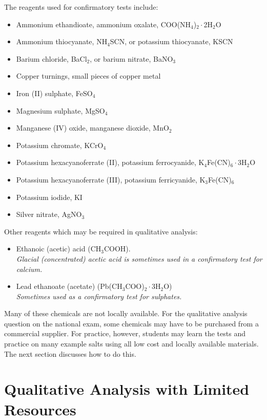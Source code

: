 The reagents used for confirmatory tests include:
\begin{itemize}
\item{Ammonium ethandioate, 
ammonium oxalate, 
COO(NH$_{4}$)$_{2} \cdot$2H$_{2}$O}
\item{Ammonium thiocyanate, 
NH$_{4}$SCN, 
or potassium thiocyanate, 
KSCN}
\item{Barium chloride, 
BaCl$_{2}$, 
or barium nitrate, 
BaNO$_{3}$}
\item{Copper turnings, 
small pieces of copper metal}
\item{Iron (II) sulphate, 
FeSO$_{4}$}
\item{Magnesium sulphate, 
MgSO$_{4}$}
\item{Manganese (IV) oxide, 
manganese dioxide, 
MnO$_{2}$}
\item{Potassium chromate, 
KCrO$_{4}$}
\item{Potassium hexacyanoferrate (II), 
potassium ferrocyanide, 
K$_{4}$Fe(CN)$_{6} \cdot$3H$_{2}$O}
\item{Potassium hexacyanoferrate (III), 
potassium ferricyanide, 
K$_{3}$Fe(CN)$_{6}$}
\item{Potassium iodide, 
KI}
\item{Silver nitrate, 
AgNO$_{3}$}
\end{itemize}

Other reagents which may be required in qualitative analysis:
\begin{itemize}
\item{Ethanoic (acetic) acid (CH$_{3}$COOH).}\\
\textit{Glacial (concentrated) acetic acid 
is sometimes used in a confirmatory test for calcium.}
\item{Lead ethanoate (acetate) (Pb(CH$_{3}$COO)$_{2} \cdot$3H$_{2}$O)}\\
\textit{Sometimes used as a confirmatory test for sulphates.}
\end{itemize}

Many of these chemicals are not locally available. For the qualitative analysis question on the national exam, some chemicals may have to be purchased from a commercial supplier. For practice, however, students may learn the tests and practice on many example salts using all low cost and locally available materials. The next section discusses how to do this.

\section{Qualitative Analysis with Limited Resources}

